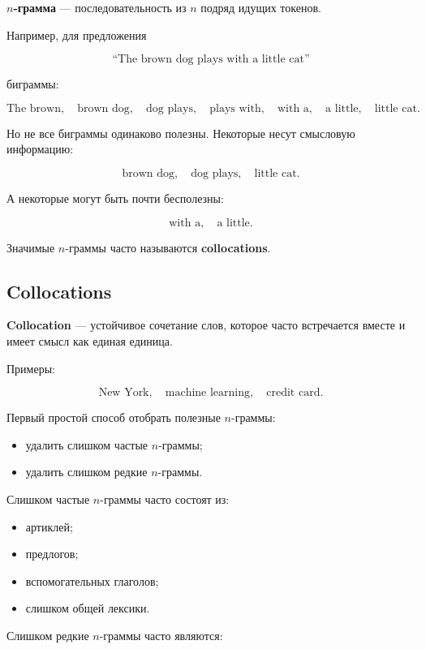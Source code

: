 \documentclass[a4paper,12pt]{article}
\begin{document}
\textbf{\(n\)-грамма} --- последовательность из \(n\) подряд идущих токенов.

Например, для предложения

\[
\text{``The brown dog plays with a little cat''}
\]

биграммы:

\[
\text{The brown}, \quad
\text{brown dog}, \quad
\text{dog plays}, \quad
\text{plays with}, \quad
\text{with a}, \quad
\text{a little}, \quad
\text{little cat}.
\]

Но не все биграммы одинаково полезны. Некоторые несут смысловую информацию:

\[
\text{brown dog}, \quad
\text{dog plays}, \quad
\text{little cat}.
\]

А некоторые могут быть почти бесполезны:

\[
\text{with a}, \quad
\text{a little}.
\]

Значимые \(n\)-граммы часто называются \textbf{collocations}.

\subsection{Collocations}

\textbf{Collocation} --- устойчивое сочетание слов, которое часто встречается вместе и имеет смысл как единая единица.

Примеры:

\[
\text{New York}, \quad
\text{machine learning}, \quad
\text{credit card}.
\]

Первый простой способ отобрать полезные \(n\)-граммы:

\begin{itemize}
    \item удалить слишком частые \(n\)-граммы;
    \item удалить слишком редкие \(n\)-граммы.
\end{itemize}

Слишком частые \(n\)-граммы часто состоят из:

\begin{itemize}
    \item артиклей;
    \item предлогов;
    \item вспомогательных глаголов;
    \item слишком общей лексики.
\end{itemize}

Слишком редкие \(n\)-граммы часто являются:
\end{document}
